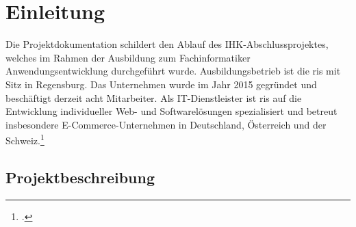 \documentclass[11pt, a4paper, oneside]{report}
\begin{document}
{%
  \let\clearpage\relax
  \let\cleardoublepage\relax
  \singlespacing
  \renewcommand{\addvspace}[1]{}%
  \listoffigures
  \listoftables
  \lstlistoflistings
}

\clearpage
{\singlespacing
  \printglossary[type=\acronymtype, title=Abkürzungsverzeichnis]
}

\cleardoublepage
{}
\setcounter{page}{1}

\chapter{Einleitung}

Die Projektdokumentation schildert den Ablauf des IHK-Abschlussprojektes, welches
im Rahmen der Ausbildung zum Fachinformatiker Anwendungsentwicklung durchgeführt wurde.
Ausbildungsbetrieb ist die \gls{ris} mit Sitz in Regensburg. Das Unternehmen wurde im Jahr 2015
gegründet und beschäftigt derzeit acht Mitarbeiter. Als IT-Dienstleister ist \gls{ris} auf die
Entwicklung individueller Web- und Softwarelösungen spezialisiert und betreut insbesondere
E-Commerce-Unternehmen in Deutschland, Österreich und der Schweiz.\footcite{ris_website}
\section{Projektbeschreibung}
\end{document}
